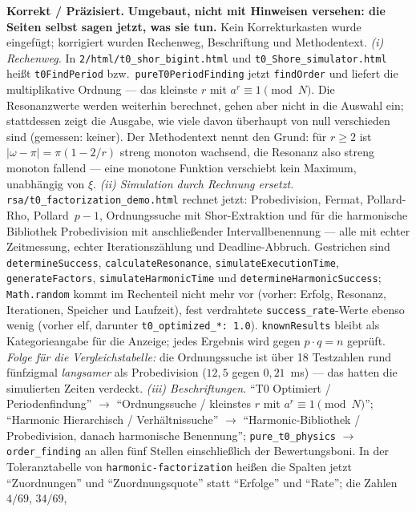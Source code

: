 \smallskip\noindent\textbf{Korrekt / Präzisiert.}\quad
\textbf{Umgebaut, nicht mit Hinweisen versehen: die Seiten selbst sagen
jetzt, was sie tun.} Kein Korrekturkasten wurde eingefügt; korrigiert
wurden Rechenweg, Beschriftung und Methodentext.
\emph{(i) Rechenweg.} In \texttt{2/html/t0\_shor\_bigint.html} und
\texttt{t0\_Shore\_simulator.html} heißt \texttt{t0FindPeriod} bzw.\
\texttt{pureT0PeriodFinding} jetzt \texttt{findOrder} und liefert die
multiplikative Ordnung --- das kleinste $r$ mit $a^r \equiv 1 \pmod N$.
Die Resonanzwerte werden weiterhin berechnet, gehen aber nicht in die
Auswahl ein; stattdessen zeigt die Ausgabe, wie viele davon überhaupt
von null verschieden sind (gemessen: keiner). Der Methodentext nennt den
Grund: für $r \ge 2$ ist $|\omega-\pi| = \pi(1-2/r)$ streng monoton
wachsend, die Resonanz also streng monoton fallend --- eine monotone
Funktion verschiebt kein Maximum, unabhängig von $\xi$.
\emph{(ii) Simulation durch Rechnung ersetzt.}
\texttt{rsa/t0\_factorization\_demo.html} rechnet jetzt: Probedivision,
Fermat, Pollard-Rho, Pollard~$p-1$, Ordnungssuche mit Shor-Extraktion und
für die harmonische Bibliothek Probedivision mit anschließender
Intervallbenennung --- alle mit echter Zeitmessung, echter
Iterationszählung und Deadline-Abbruch. Gestrichen sind
\texttt{determineSuccess}, \texttt{calculateResonance},
\texttt{simulateExecutionTime}, \texttt{generateFactors},
\texttt{simulateHarmonicTime} und \texttt{determineHarmonicSuccess};
\texttt{Math.random} kommt im Rechenteil nicht mehr vor (vorher: Erfolg,
Resonanz, Iterationen, Speicher und Laufzeit), fest verdrahtete
\texttt{success\_rate}-Werte ebenso wenig (vorher elf, darunter
\texttt{t0\_optimized\_*: 1.0}). \texttt{knownResults} bleibt als
Kategorieangabe für die Anzeige; jedes Ergebnis wird gegen $p\cdot q = n$
geprüft. \emph{Folge für die Vergleichstabelle:} die Ordnungssuche ist
über 18 Testzahlen rund fünfzigmal \emph{langsamer} als Probedivision
($12{,}5$ gegen $0{,}21$~ms) --- das hatten die simulierten Zeiten
verdeckt.
\emph{(iii) Beschriftungen.} \enquote{T0 Optimiert / Periodenfindung}
$\to$ \enquote{Ordnungssuche / kleinstes $r$ mit $a^r \equiv 1 \pmod N$};
\enquote{Harmonic Hierarchisch / Verhältnissuche} $\to$
\enquote{Harmonic-Bibliothek / Probedivision, danach harmonische
Benennung}; \texttt{pure\_t0\_physics} $\to$ \texttt{order\_finding} an
allen fünf Stellen einschließlich der Bewertungsboni. In der
Toleranztabelle von \texttt{harmonic-factorization} heißen die Spalten
jetzt \enquote{Zuordnungen} und \enquote{Zuordnungsquote} statt
\enquote{Erfolge} und \enquote{Rate}; die Zahlen $4/69$, $34/69$,
